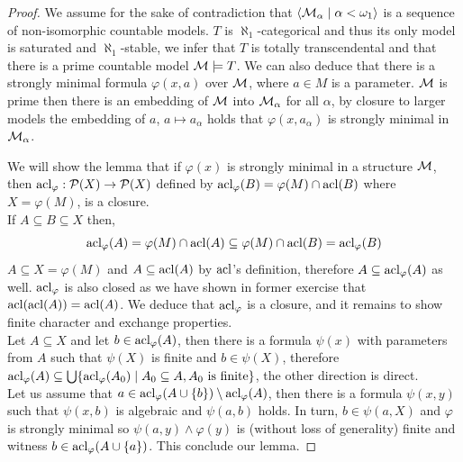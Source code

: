 \begin{proof}
	We assume for the sake of contradiction that $\langle \mathcal{M}_{\alpha} \mid \alpha < \omega_1 \rangle$ is a sequence of non-isomorphic countable models.
	$T$ is $\aleph_1$-categorical and thus its only model is saturated and $\aleph_1$-stable, we infer that $T$ is totally transcendental and that there is a prime countable model $\mathcal{M} \models T$.
	We can also deduce that there is a strongly minimal formula $\varphi(x, a)$ over $\mathcal{M}$, where $a \in M$ is a parameter.
	$\mathcal{M}$ is prime then there is an embedding of $\mathcal{M}$ into $\mathcal{M}_{\alpha}$ for all $\alpha$, by closure to larger models the embedding of $a$,
	$a \mapsto a_{\alpha}$ holds that $\varphi(x, a_{\alpha})$ is strongly minimal in $\mathcal{M}_{\alpha}$.

	We will show the lemma that if $\varphi(x)$ is strongly minimal in a structure $\mathcal{M}$, then $\operatorname{acl}_\varphi : \mathcal{P}(X) \to \mathcal{P}(X)$ defined by $\operatorname{acl}_\varphi(B) = \varphi(M) \cap \operatorname{acl}(B)$ where $X = \varphi(M)$, is a closure. \\
	If $A \subseteq B \subseteq X$ then,
	\[
		\operatorname{acl}_\varphi(A)
		= \varphi(M) \cap \operatorname{acl}(A)
		\subseteq \varphi(M) \cap \operatorname{acl}(B)
		= \operatorname{acl}_\varphi(B)
	\]
	$A \subseteq X = \varphi(M)$ and $A \subseteq \operatorname{acl}(A)$ by $\operatorname{acl}$'s definition, therefore $A \subseteq \operatorname{acl}_\varphi(A)$ as well.
	$\operatorname{acl}_\varphi$ is also closed as we have shown in former exercise that $\operatorname{acl}(\operatorname{acl}(A)) = \operatorname{acl}(A)$.
	We deduce that $\operatorname{acl}_\varphi$ is a closure, and it remains to show finite character and exchange properties. \\
	Let $A \subseteq X$ and let $b \in \operatorname{acl}_\varphi(A)$, then there is a formula $\psi(x)$ with parameters from $A$ such that $\psi(X)$ is finite and $b \in \psi(X)$,
	therefore $\operatorname{acl}_\varphi(A) \subseteq \bigcup \{ \operatorname{acl}_\varphi(A_0) \mid A_0 \subseteq A, A_0 \text{ is finite} \}$, the other direction is direct. \\
	Let us assume that $a \in \operatorname{acl}_\varphi(A \cup \{ b \}) \setminus \operatorname{acl}_\varphi(A)$, then there is a formula $\psi(x, y)$ such that $\psi(x, b)$ is algebraic and $\psi(a, b)$ holds.
	In turn, $b \in \psi(a, X)$ and $\varphi$ is strongly minimal so $\psi(a, y) \land \varphi(y)$ is (without loss of generality) finite and witness $b \in \operatorname{acl}_\varphi(A \cup \{ a \})$.
	This conclude our lemma.


\end{proof}
